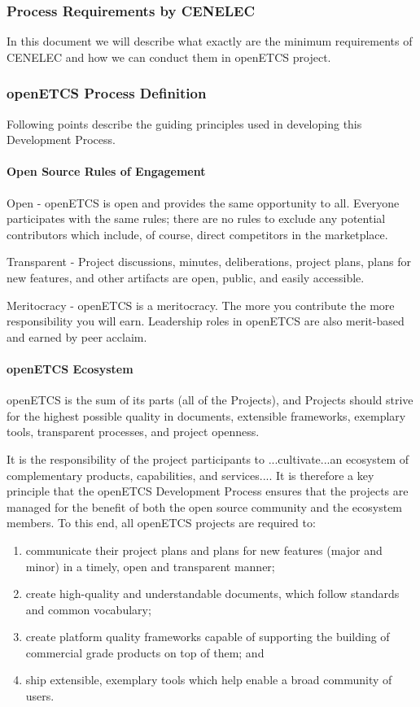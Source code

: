 \documentclass{template/openetcs_article}
\begin{document}
\subsubsection{Process Requirements by CENELEC}
In this document we will describe what exactly are the minimum requirements of CENELEC and how we can conduct them in openETCS project.


\subsubsection{openETCS Process Definition}
Following points describe the guiding principles used in developing this Development Process.


\paragraph{Open Source Rules of Engagement}
Open - openETCS is open and provides the same opportunity to all. Everyone participates with the same rules; there are no rules to exclude any potential contributors which include, of course, direct competitors in the marketplace.

Transparent - Project discussions, minutes, deliberations, project plans, plans for new features, and other artifacts are open, public, and easily accessible.

Meritocracy - openETCS is a meritocracy. The more you contribute the more responsibility you will earn. Leadership roles in openETCS are also merit-based and earned by peer acclaim.

\paragraph{openETCS Ecosystem}
openETCS is the sum of its parts (all of the Projects), and Projects should strive for the highest possible quality in documents, extensible frameworks, exemplary tools, transparent processes, and project openness.

It is the responsibility of the project participants to ...cultivate...an ecosystem of complementary products, capabilities, and services.... It is therefore a key principle that the openETCS Development Process ensures that the projects are managed for the benefit of both the open source community and the ecosystem members. To this end, all openETCS projects are required to:
\begin{enumerate}
\item communicate their project plans and plans for new features (major and minor) in a timely, open and transparent manner;
\item create high-quality and understandable documents, which follow standards and common vocabulary;
\item create platform quality frameworks capable of supporting the building of commercial grade products on top of them; and
\item ship extensible, exemplary tools which help enable a broad community of users.
\end{enumerate}
\end{document}
